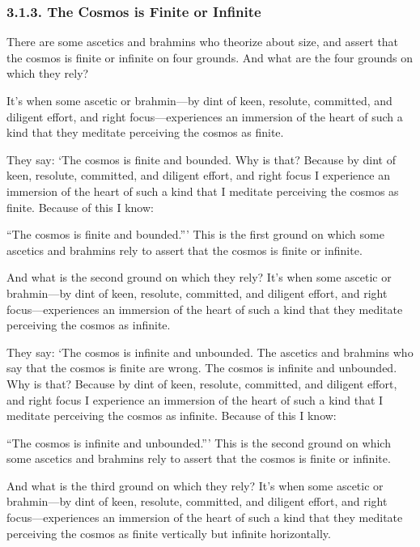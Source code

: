\documentclass[12pt,openany]{book}%
\begin{document}
\subsubsection*{3.1.3. The Cosmos is Finite or Infinite }

There are some ascetics and brahmins who theorize about size, and assert that the cosmos is finite or infinite on four grounds. And what are the four grounds on which they rely? 

It’s when some ascetic or brahmin—by dint of keen, resolute, committed, and diligent effort, and right focus—experiences an immersion of the heart of such a kind that they meditate perceiving the cosmos as finite. 

They say: ‘The cosmos is finite and bounded. Why is that? Because by dint of keen, resolute, committed, and diligent effort, and right focus I experience an immersion of the heart of such a kind that I meditate perceiving the cosmos as finite. Because of this I know: 

“The cosmos is finite and bounded.”’ This is the first ground on which some ascetics and brahmins rely to assert that the cosmos is finite or infinite. 

And what is the second ground on which they rely? It’s when some ascetic or brahmin—by dint of keen, resolute, committed, and diligent effort, and right focus—experiences an immersion of the heart of such a kind that they meditate perceiving the cosmos as infinite. 

They say: ‘The cosmos is infinite and unbounded. The ascetics and brahmins who say that the cosmos is finite are wrong. The cosmos is infinite and unbounded. Why is that? Because by dint of keen, resolute, committed, and diligent effort, and right focus I experience an immersion of the heart of such a kind that I meditate perceiving the cosmos as infinite. Because of this I know: 

“The cosmos is infinite and unbounded.”’ This is the second ground on which some ascetics and brahmins rely to assert that the cosmos is finite or infinite. 

And what is the third ground on which they rely? It’s when some ascetic or brahmin—by dint of keen, resolute, committed, and diligent effort, and right focus—experiences an immersion of the heart of such a kind that they meditate perceiving the cosmos as finite vertically but infinite horizontally. 
\end{document}
